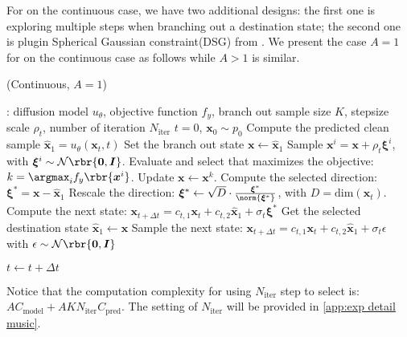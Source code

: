 For \xcleansampling on the continuous case, we have two additional designs: the first one is exploring multiple steps when branching out a destination state; the second one is plugin Spherical Gaussian constraint(DSG) from \cite{yang2024guidance}. We present the case $A=1$ for \xcleansampling on the continuous case as follows while $A>1$ is similar.

\begin{algorithm}
    \begin{algorithmic}[1]
    \caption{\xcleansampling  (Continuous, $A=1$)}
    \label{alg:music detailed}
    : diffusion model $u_\theta$, objective function $f_y$, branch out sample size $K$, stepsize scale $\rho_t$, number of iteration $N_{\text{iter}}$
    \STATE $t=0$, $\boldsymbol{x}_0 \sim p_0$
    \STATE Compute the predicted clean sample $\hat{\boldsymbol{x}}_1 = u_\theta(\boldsymbol{x}_t, t)$
    \STATE Set the branch out state $\boldsymbol{x} \leftarrow \hat{\boldsymbol{x}}_1 $
    \STATE Sample $\boldsymbol{x}^i = \boldsymbol{x} + \rho_t \boldsymbol{\xi}^i $, with $\boldsymbol{\xi}^i \sim \mathcal{N}\rbr{\boldsymbol{0},  \boldsymbol{I}}$.
    \STATE Evaluate and select that maximizes the objective: $k = \argmax_i f_y\rbr{\boldsymbol{x}^i}$.
    \STATE Update $\boldsymbol{x} \leftarrow \boldsymbol{x}^k$.
    \ENDFOR
        \STATE Compute the selected direction: $\boldsymbol{\xi}^\ast = \boldsymbol{x} - \hat{\boldsymbol{x}}_1$
    \STATE Rescale the direction: $\boldsymbol{\xi}^\ast \leftarrow \sqrt{D}\cdot \frac{\boldsymbol{\xi}^\ast}{\norm{\boldsymbol{\xi}^\ast}}$, with $D = \text{dim}(\boldsymbol{x}_t)$.
    \STATE Compute the next state: $\boldsymbol{x}_{t+\Delta t}  = c_{t,1} \boldsymbol{x}_t + c_{t,2} \hat{\boldsymbol{x}}_1  + \sigma_t \boldsymbol{\xi}^\ast $
    \ELSE
    \STATE Get the selected destination state $ \hat{\boldsymbol{x}}_1 \leftarrow \boldsymbol{x} $
 \STATE Sample the next state: $\boldsymbol{x}_{t+\Delta t}  = c_{t,1} \boldsymbol{x}_t + c_{t,2} \hat{\boldsymbol{x}}_1  + \sigma_t \epsilon$ with $\epsilon \sim \mathcal{N}\rbr{\boldsymbol{0}, \boldsymbol{I}}$
    \ENDIF

    

\STATE $t \leftarrow t + \Delta t $
    \ENDWHILE
\end{algorithmic}
\end{algorithm}

Notice that the computation complexity for using $N_{\text{iter}}$ step to select is:  $AC_{\text{model}}+AKN_{\text{iter}}C_{\text{pred}}$. The setting of $N_{\text{iter}}$ will be provided in \cref{app:exp detail music}.



